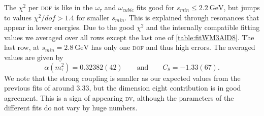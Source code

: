 \documentclass[../../index.tex]{subfiles}
\begin{document}
The \(\chi^2\) per \textsc{dof} is like in the \(\omega_\tau\) and
\(\omega_{cubic}\) fits good for \(s_{min}\leq \SI{2.2}{\giga\eV}\), but jumps
to values \(\chi^2/dof>1.4\) for smaller \(s_{min}\). This is explained through
resonances that appear in lower energies. Due to the good \(\chi^2\) and the
internally compatible fitting values we averaged over all rows except the last
one of \cref{table:fitWM3AlD8}. The last row, at \(s_{min}=\SI{2.8}{\giga\eV}\)
has only one \textsc{dof} and thus high errors. The averaged values are given by
\begin{equation}
  \alpha(m_\tau^2) = 0.32382(42) \qquad \text{and} \qquad C_8=-1.33(67).
\end{equation}
We note that the strong coupling is smaller as our expected values from the
previous fits of around \(3.33\), but the dimension eight contribution is
in good agreement. This is a sign of appearing \textsc{dv}, although the
parameters of the different fits do not vary by huge numbers.
\end{document}
